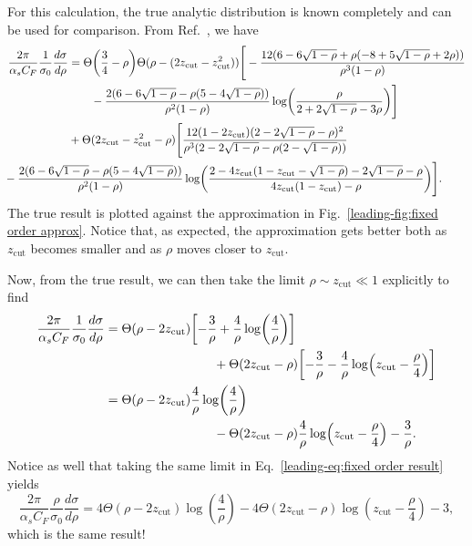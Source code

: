 \documentclass[../thesis.tex]{subfiles}
\providecommand{\zcut}{z_\mathrm{{cut}}}
\begin{document}
	For this calculation, the true analytic distribution is known completely and can be used for comparison. From Ref.~\cite{larkoski_improving_2020}, we have
	\begin{equation}
	\begin{aligned}
		\frac{2\pi}{\alpha_s C_F}\frac{1}{\sigma_0}\frac{d\sigma}{d\rho} &= \Theta\qty(\frac{3}{4}-\rho)\Theta(\rho - (2\zcut - \zcut^2))\Bigg[ -\frac{12(6-6\sqrt{1-\rho} + \rho(-8 + 5\sqrt{1- \rho} + 2\rho))}{\rho^3(1 - \rho)} \\
		&\qquad- \frac{2(6 - 6 \sqrt{1 - \rho} - \rho(5 - 4\sqrt{1 - \rho}))}{\rho^2(1 - \rho)} \log(\frac{\rho}{2 + 2\sqrt{1 - \rho} - 3\rho}) \Bigg] \\
		&+ \Theta(2\zcut - \zcut^2 - \rho)\Bigg[ \frac{12(1 - 2\zcut)(2 - 2\sqrt{1 - \rho} - \rho)^2}{\rho^3(2 - 2\sqrt{1 - \rho} - \rho(2 - \sqrt{1 - \rho}))} \\ 
		&\hspace{-2cm}- \frac{2(6 -6 \sqrt{1 - \rho} - \rho(5 - 4\sqrt{1 - \rho}))}{\rho^2(1 - \rho)}\log(\frac{2 - 4\zcut(1 - \zcut - \sqrt{1 - \rho}) - 2\sqrt{1 - \rho} - \rho}{4\zcut(1 - \zcut) - \rho})\Bigg].
	\end{aligned}
	\end{equation}
	The true result is plotted against the approximation in Fig.~\ref{leading-fig:fixed order approx}. Notice that, as expected, the approximation gets better both as $\zcut$ becomes smaller and as $\rho$ moves closer to $\zcut$.

	Now, from the true result, we can then take the limit $\rho \sim \zcut \ll 1$ explicitly to find
	\begin{equation}
	\begin{aligned}
		\frac{2\pi}{\alpha_s C_F}\frac{1}{\sigma_0}\frac{d\sigma}{d\rho} &=\Theta(\rho - 2\zcut)\qty[-\frac{3}{\rho} + \frac{4}{\rho} \log(\frac{4}{\rho})] \\
			&\hspace{3cm}+ \Theta(2\zcut - \rho)\qty[ -\frac{3}{\rho} - \frac{4}{\rho}\log(\zcut - \frac{\rho}{4})] \\
		&= \Theta(\rho - 2\zcut)\frac{4}{\rho} \log(\frac{4}{\rho}) \\
			&\hspace{3cm}- \Theta(2\zcut - \rho)\frac{4}{\rho}\log(\zcut - \frac{\rho}{4}) - \frac{3}{\rho}.
	\end{aligned}
	\end{equation}
	Notice as well that taking the same limit in Eq.~\ref{leading-eq:fixed order result} yields
	\begin{equation}
		\frac{2\pi}{\alpha_s C_F}\frac{\rho}{\sigma_0}\frac{d\sigma}{d\rho} = 4\Theta(\rho - 2\zcut)\log(\frac{4}{\rho}) - 4\Theta(2\zcut - \rho)\log(\zcut - \frac{\rho}{4}) - 3,
	\end{equation}
	which is the same result!
	
\end{document}
